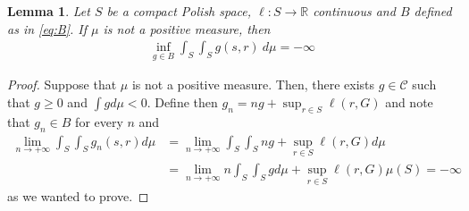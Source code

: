 \documentclass{article}
\newcommand{\R}{\mathbb{R}} %
\newtheorem{lemma}[theorem]{Lemma}
\theoremstyle{definition}
\theoremstyle{remarksty}
\begin{document}
\begin{lemma}\label{lemma:B-conjugate}
    Let $S$ be a compact Polish space, $\ell: S \to \R$ continuous and $B$ defined as in \eqref{eq:B}. If $\mu$ is not a positive measure, then
    \begin{align}
        \inf_{g \in B} \int_S\int_S g(s,r) \ d\mu = - \infty
    \end{align}
\end{lemma}

\begin{proof}
    Suppose that $\mu$ is not a positive measure. Then, there exists $g \in \mathcal{C}$ such that $g\geq 0$ and $\int g d\mu < 0$. Define then $g_n = ng + \sup_{r \in S} \ell(r,G)$ and note that $g_n \in B$ for every $n$ and 
\begin{align*}
\lim_{n \rightarrow + \infty} \int_S\int_S g_n(s,r) d\mu &  =  \lim_{n \rightarrow + \infty} \int_S\int_S ng + \sup_{r \in S} \ell(r,G) d\mu \\
& =  \lim_{n \rightarrow + \infty} n \int_S\int_S gd\mu + \sup_{r \in S} \ell(r,G) \mu(S) = -\infty
\end{align*}
as we wanted to prove.
\end{proof}
\end{document}
